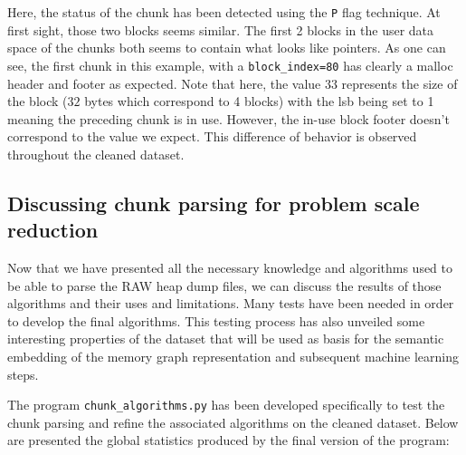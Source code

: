     Here, the status of the chunk has been detected using the \texttt{P} flag technique. At first sight, those two blocks seems similar. The first 2 blocks in the user data space of the chunks both seems to contain what looks like pointers. As one can see, the first chunk in this example, with a \texttt{block\_index=80} has clearly a malloc header and footer as expected. Note that here, the value $33$ represents the size of the block ($32$ bytes which correspond to 4 blocks) with the \acrshort{lsb} being set to 1 meaning the preceding chunk is in use. However, the in-use block footer doesn't correspond to the value we expect. This difference of behavior is observed throughout the cleaned dataset. 

    \subsection{Discussing chunk parsing for problem scale reduction}
    Now that we have presented all the necessary knowledge and algorithms used to be able to parse the RAW heap dump files, we can discuss the results of those algorithms and their uses and limitations. Many tests have been needed in order to develop the final algorithms. This testing process has also unveiled some interesting properties of the dataset that will be used as basis for the semantic embedding of the memory graph representation and subsequent machine learning steps.

    The program \texttt{chunk\_algorithms.py} has been developed specifically to test the chunk parsing and refine the associated algorithms on the cleaned dataset. Below are presented the global statistics produced by the final version of the program:

